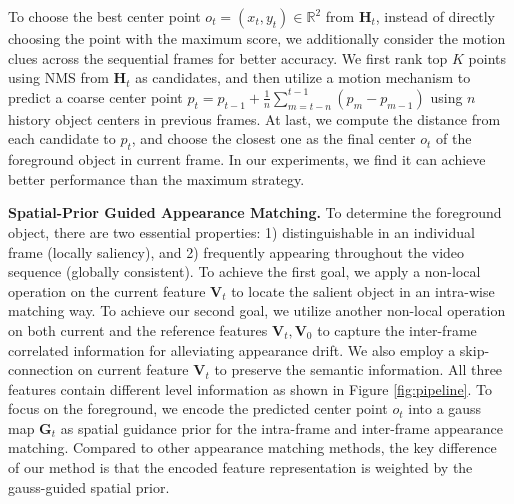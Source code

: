 \documentclass[letterpaper]{article} \usepackage{aaai20}  \usepackage{times}  \usepackage{helvet} \usepackage{courier}  \usepackage[hyphens]{url}  \usepackage{graphicx} \urlstyle{rm} \def\UrlFont{\rm}  \usepackage{graphicx}  \frenchspacing  \setlength{\pdfpagewidth}{8.5in}  \setlength{\pdfpageheight}{11in}  \usepackage{amssymb}
\begin{document}
To choose the best center point $o_t=(x_t,y_t) \in \mathbb{R}^2$ from $\bm{H}_t$, instead of directly choosing the point with the maximum score, we additionally consider the motion clues across the sequential frames for better accuracy. We first rank top $K$ points using NMS \cite{lin2017focal} from $\bm{H}_t$ as candidates, and then utilize a motion mechanism \cite{xu2019mhp} to predict a coarse center point $p_t = p_{t-1}+\frac{1}{n}\sum_{m=t-n}^{t-1}(p_m-p_{m-1})$ using $n$ history object centers in previous frames. At last, we compute the distance from each candidate to $p_t$, and choose the closest one as the final center $o_t$ of the foreground object in current frame. In our experiments, we find it can achieve better performance than the maximum strategy. 


\noindent \textbf{Spatial-Prior Guided Appearance Matching.}
To determine the foreground object, there are two essential properties: 1) distinguishable in an individual frame
(locally saliency), and 2) frequently appearing throughout the video sequence (globally consistent).
To achieve the first goal, 
we apply a non-local operation \cite{wang2018non} on the current feature $\bm{V}_t$ to locate the salient object in an intra-wise matching way. To achieve our second goal, we utilize another non-local operation on both current and the reference features $\bm{V}_t,\bm{V}_0$ to capture the inter-frame correlated information for alleviating appearance drift. We also employ a skip-connection on current feature $\bm{V}_t$ to preserve the semantic information. All three features contain different level information as shown in Figure \ref{fig:pipeline}. To focus on the foreground, we encode the predicted center point $o_t$ into a gauss map $\bm{G}_t$ as spatial guidance prior for the intra-frame and inter-frame appearance matching. 
Compared to other appearance matching methods, the key difference of our method is that the encoded feature representation is weighted by the gauss-guided spatial prior.
\end{document}
